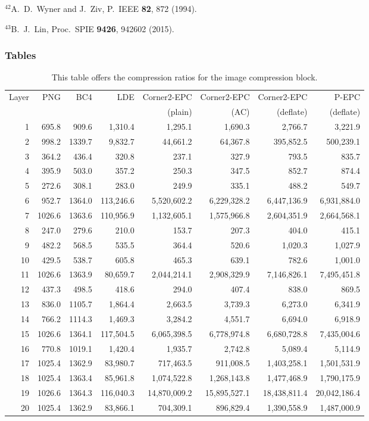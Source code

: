 \documentclass{article}
\begin{document}
\noindent $^{42}$A.~D.~Wyner and J.~Ziv, P.~IEEE {\bf 82}, 872 (1994).

\noindent $^{43}$B.~J.~Lin, Proc.~SPIE {\bf 9426}, 942602 (2015).

\subsubsection*{Tables}
\begin{table}
\caption{This table offers the compression ratios for the image 
compression block.}
\label{table:compression-denny}
\begin{center}
\begin{tabular}{r r r r r r r r}
\hline
\hline
Layer & PNG & BC4 & LDE & Corner2-EPC & Corner2-EPC & Corner2-EPC & P-EPC \tabularnewline
\mbox{} & \mbox{} & \mbox{} & \mbox{} & (plain) & (AC) & (deflate)
& (deflate) \tabularnewline
\hline
1 & 695.8 & 909.6 & 1,310.4 & 1,295.1 & 1,690.3 & 2,766.7 & 3,221.9
\tabularnewline
2 & 998.2 & 1339.7 & 9,832.7 & 44,661.2 & 64,367.8 & 395,852.5 & 500,239.1
\tabularnewline
3 & 364.2 & 436.4 & 320.8 & 237.1 & 327.9 & 793.5 & 835.7
\tabularnewline
4 & 395.9 & 503.0 & 357.2 & 250.3 & 347.5 & 852.7 & 874.4
\tabularnewline
5 & 272.6 & 308.1 & 283.0 & 249.9 & 335.1 & 488.2 & 549.7
\tabularnewline
6 & 952.7 & 1364.0 & 113,246.6 & 5,520,602.2 & 6,229,328.2 & 6,447,136.9 & 6,931,884.0
\tabularnewline
7 & 1026.6 & 1363.6 & 110,956.9 & 1,132,605.1 & 1,575,966.8 & 2,604,351.9 & 2,664,568.1
\tabularnewline
8 & 247.0 & 279.6 & 210.0 & 153.7 & 207.3 & 404.0 & 415.1
\tabularnewline
9 & 482.2 & 568.5 & 535.5 & 364.4 & 520.6  & 1,020.3 & 1,027.9
\tabularnewline
10 & 429.5 & 538.7 & 605.8 & 465.3 & 639.1 & 782.6 & 1,001.0
\tabularnewline
11 & 1026.6 & 1363.9 & 80,659.7 & 2,044,214.1 & 2,908,329.9 & 7,146,826.1 & 7,495,451.8
\tabularnewline
12 & 437.3 & 498.5 & 418.6 & 294.0 & 407.4 & 838.0 & 869.5
\tabularnewline
13 & 836.0 & 1105.7 & 1,864.4 & 2,663.5 & 3,739.3 & 6,273.0 & 6,341.9
\tabularnewline
14 & 766.2 & 1114.3 & 1,469.3 & 3,284.2 & 4,551.7 & 6,694.0 & 6,918.9
\tabularnewline
15 & 1026.6 & 1364.1 & 117,504.5 & 6,065,398.5 & 6,778,974.8 & 6,680,728.8 & 7,435,004.6
\tabularnewline
16 & 770.8 & 1019.1 & 1,420.4 & 1,935.7 & 2,742.8 & 5,089.4 & 5,114.9
\tabularnewline
17 & 1025.4 & 1362.9 & 83,980.7 & 717,463.5 & 911,008.5 & 1,403,258.1 & 1,501,531.9
\tabularnewline
18 & 1025.4 & 1363.4 & 85,961.8 & 1,074,522.8 & 1,268,143.8 & 1,477,468.9 & 1,790,175.9
\tabularnewline
19 & 1026.6 & 1364.3 & 116,040.3 & 14,870,009.2 & 15,895,527.1 & 18,438,811.4 & 20,042,186.4
\tabularnewline
20 & 1025.4 & 1362.9 & 83,866.1 & 704,309.1 & 896,829.4 & 1,390,558.9 & 1,487,000.9

\end{tabular}
\end{center}
\end{table}
\end{document}
